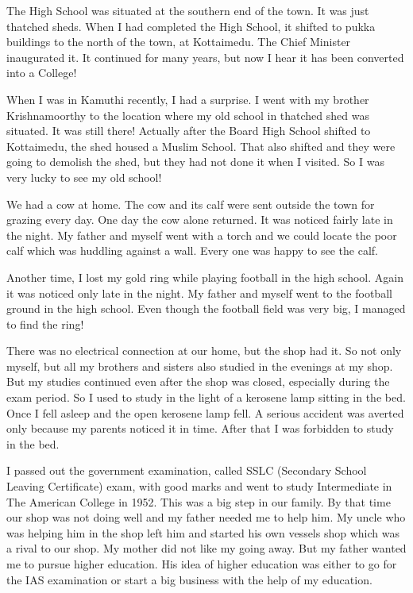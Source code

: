 The High School was situated at the southern end of the town. It was 
just thatched sheds. When I had completed the High School, it shifted to 
pukka buildings to the north of the town, at Kottaimedu. The Chief 
Minister inaugurated it. It conti\-nued for many years, but now I hear it 
has been converted into a Colleg\-e!

When I was in Kamuthi recently, I had a surprise. I went with my brother 
Krishnamoorthy to the location where my old school in thatched shed was 
situated. It was still there! Actually after the Board High School 
shifted to Kottaimedu, the shed housed a Muslim School. That also 
shifted and they were going to demolish the shed, but they had not done 
it when I visited. So I was very lucky to see my old school!

We had a cow at home. The cow and its calf were sent outside the town 
for grazing every day. One day the cow alone returned. It was noticed 
fairly late in the night. My father and myself went with a torch and we 
could locate the poor calf which was huddling against a wall. Every one 
was happy to see the calf.

Another time, I lost my gold ring while playing football in the high 
school. Again it was noticed only late in the night. My father and 
myself went to the football ground in the high school. Even though the 
football field was very big, I managed to find the ring!

There was no electrical connection at our home, but the shop had it. So 
not only myself, but all my brothers and sisters also studied in the 
evenings at my shop. But my studies continued even after the shop was 
closed, especially during the exam period. So I used to study in the 
light of a kerosene lamp sitting in the bed. Once I fell asleep and the 
open kerosene lamp fell. A serious accident was averted only because my 
parents noticed it in time. After that I was forbidden to study in the 
bed.

I passed out the government examination, called SSLC (Seco\-ndary School 
Leaving Certificate) exam, with good marks and went to study 
Intermediate in The American College in 1952. This was a big step in our 
family. By that time our shop was not doing well and my father needed me 
to help him. My uncle who was helping him in the shop left him and 
started his own vessels shop which was a rival to our shop. My mother 
did not like my going away. But my father wanted me to pursue higher 
education. His idea of higher education was either to go for the IAS 
examination or start a big business with the help of my education.

